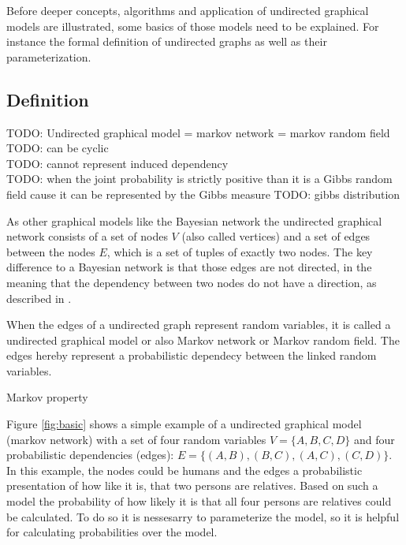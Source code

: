 Before deeper concepts, algorithms and application of undirected graphical models are illustrated, some basics of those models need to be explained. For instance the formal definition of undirected graphs as well as their parameterization.

\subsection{Definition}

TODO: Undirected graphical model = markov network = markov random field 
TODO: can be cyclic \\
TODO: cannot represent induced dependency \\
TODO: when the joint probability is strictly positive than it is a Gibbs random field cause it can be represented by the Gibbs measure
TODO: gibbs distribution

As other graphical models like the Bayesian network the undirected graphical network consists of a set of nodes $V$ (also called vertices) and a set of edges between the nodes $E$, which is a set of tuples of exactly two nodes. The key difference to a Bayesian network is that those edges are not directed, in the meaning that the dependency between two nodes do not have a direction, as described in \cite{koller2009probabilistic}.

When the edges of a undirected graph represent random variables, it is called a undirected graphical model or also Markov network or Markov random field.\cite{kindermann1980markov} The edges hereby represent a probabilistic dependecy between the linked random variables.

Markov property \cite{markov1957theory}

Figure \ref{fig:basic} shows a simple example of a undirected graphical model (markov network) with a set of four random variables $V=\{A,B,C,D\}$ and four probabilistic dependencies (edges): $E=\{(A,B),(B,C),(A,C),(C,D)\}$. In this example, the nodes could be humans and the edges a probabilistic presentation of how like it is, that two persons are relatives. Based on such a model the probability of how likely it is that all four persons are relatives could be calculated. To do so it is nessesarry to parameterize the model, so it is helpful for calculating probabilities over the model.

